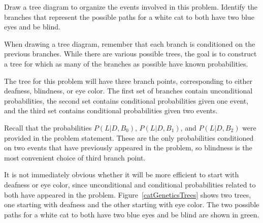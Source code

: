 \begin{example}{Draw a tree diagram to organize the events involved in this problem. Identify the branches that represent the possible paths for a white cat to both have two blue eyes and be blind. }

When drawing a tree diagram, remember that each branch is conditioned on the previous branches. While there are various possible trees, the goal is to construct a tree for which as many of the branches as possible have known probabilities. 

The tree for this problem will have three branch points, corresponding to either deafness, blindness, or eye color. The first set of branches contain unconditional probabilities, the second set contains conditional probabilities given one event, and the third set contains conditional probabilities given two events.

Recall that the probabilities $P(L|D, B_0)$, $P(L|D, B_1)$, and $P(L|D, B_2)$ were provided in the problem statement. These are the only probabilities conditioned on two events that have previously appeared in the problem, so blindness is the most convenient choice of third branch point. 

It is not immediately obvious whether it will be more efficient to start with deafness or eye color, since unconditional and conditional probabilities related to both have appeared in the problem. Figure~\ref{catGeneticsTrees} shows two trees, one starting with deafness and the other starting with eye color. The two possible paths for a white cat to both have two blue eyes and be blind are shown in green.
	

\end{example}
